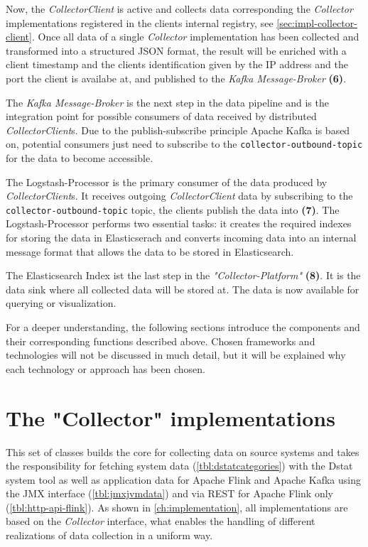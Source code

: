 Now, the \textit{CollectorClient} is active and collects data corresponding the \textit{Collector} implementations registered in
the clients internal registry, see \autoref{sec:impl-collector-client}. Once all data of a single
\textit{Collector} implementation has been collected and transformed into a structured JSON format, the result will be enriched
with a client timestamp and the clients identification given by the IP address and the port the client is availabe at, and published to the
\textit{Kafka Message-Broker} \textbf{(6)}.

The \textit{Kafka Message-Broker} is the next step in the data pipeline and is the integration point for possible consumers
of data received by distributed \textit{CollectorClient}s. Due to the publish-subscribe principle Apache Kafka is based on,
potential consumers just need to subscribe to the \verb|collector-outbound-topic| for the data to become accessible.

The Logstash-Processor is the primary consumer of the data produced by \textit{CollectorClient}s. It receives outgoing \textit{CollectorClient}
data by subscribing to the \verb|collector-outbound-topic| topic, the clients publish the data into \textbf{(7)}. The Logstash-Processor performs
two essential tasks: it creates the required indexes for storing the data in Elasticserach and converts incoming data into an internal
message format that allows the data to be stored in Elasticsearch.

The Elasticsearch Index ist the last step in the \textit{"Collector-Platform"} \textbf{(8)}. It is the data sink where all collected data will be stored at.
The data is now available for querying or visualization.

For a deeper understanding, the following sections introduce the components and their corresponding functions described above.
Chosen frameworks and technologies will not be discussed in much detail, but it will be explained why each technology or
approach has been chosen.

\section{The "Collector" implementations}

This set of classes builds the core for collecting data on source systems and takes the responsibility for fetching
system data (\autoref{tbl:dstatcategories}) with the Dstat system tool as well as application data for Apache Flink
and Apache Kafka using the JMX interface (\autoref{tbl:jmxjvmdata}) and via REST for Apache Flink only
(\autoref{tbl:http-api-flink}). As shown in \autoref{ch:implementation}, all implementations are based on the
\textit{Collector} interface, what enables the handling of different realizations of data collection in a uniform way.

